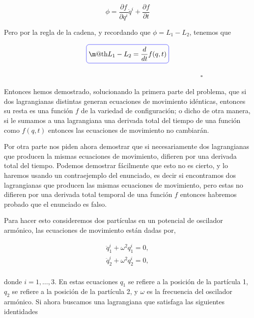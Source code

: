 \documentclass[a4paper,10pt]{article}
\makeatletter
\numberwithin{equation}{section}
\newcommand*{\boxcolor}{blue}
\renewcommand{\boxed}[1]{\textcolor{\boxcolor}{%
\tikz[baseline={([yshift=-1ex]current bounding box.center)}] \node [rectangle, minimum width=1ex,rounded corners,draw] {\normalcolor\m@th$\displaystyle#1$};}}
\makeatother
\begin{document}
\begin{equation}
 \phi = \frac{\partial f}{\partial q^i}\dot{q}^i + \frac{\partial f}{\partial t}
\end{equation}

Pero por la regla de la cadena, y recordando que $\phi = L_1 - L_2$, tenemos que

\begin{equation}
 \boxed{L_1 - L_2 = \frac{d}{dt}f(q,t)}
\end{equation}

\vspace{.2cm} $\hspace{12cm} \square$

Entonces hemos demostrado, solucionando la primera parte del problema, que si dos 
lagrangianas distintas generan ecuaciones de movimiento idénticas, entonces su resta 
es una función $f$ de la variedad de configuración; o dicho de otra manera, si le sumamos a una lagrangiana una derivada total del tiempo
de una función como $f(q,t)$ entonces las ecuaciones de movimiento no cambiarán.

\vspace{.3cm}

Por otra parte nos piden ahora demostrar que si necesariamente dos lagrangianas que 
producen la mismas ecuaciones de movimiento, difieren por una derivada total del tiempo.
Podemos demostrar fácilmente que esto no es cierto, y lo haremos usando un contraejemplo 
del enunciado, es decir si encontramos dos lagrangianas que producen las mismas 
ecuaciones de movimiento, pero estas no difieren por una derivada total temporal 
de una función $f$ entonces habremos probado que el enunciado es falso.

\vspace{.3cm}

Para hacer esto consideremos dos partículas en un potencial de oscilador armónico,
las ecuaciones de movimiento están dadas por,

\begin{align}
 \ddot{q}^i_1 + \omega^2 q^i_1 = 0, \\
 \ddot{q}^i_2 + \omega^2 q^i_2 = 0, \\ 
\end{align}

donde $i = 1,\dots,3$. En estas ecuaciones $q_1$ se refiere a la posición de la 
partícula 1, $q_2$ se refiere a la posición de la partícula 2, y $\omega$ es la frecuencia 
del oscilador armónico. Si ahora buscamos una lagrangiana que satisfaga las siguientes 
identidades
\end{document}

